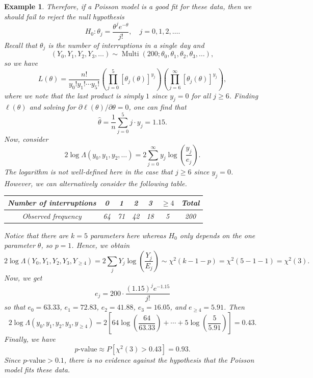 \documentclass[10pt]{article}
\DeclareMathOperator{\Multi}{Multi}
\theoremstyle{newstyle}
\newtheorem{exmp}[thm]{Example}
\begin{document}
\begin{exmp}
{Therefore, if a Poisson model is a good fit for these data, then we should fail to reject the 
null hypothesis 
\[ H_0 : \theta_j = \frac{\theta^j e^{-\theta}}{j!}, \quad j = 0, 1, 2, \dots. \]
Recall that $\theta_j$ is the number of interruptions in a single day and 
\[ (Y_0, Y_1, Y_2, Y_3, \dots) \sim \Multi(200; \theta_0, \theta_1, \theta_2, \theta_3, \dots), \]
so we have
\[ L(\theta) = \frac{n!}{y_0!y_1! \cdots y_5!} \left( \prod_{j=0}^5 [\theta_j(\theta)]^{y_j} \right) 
\left( \prod_{j=6}^\infty [\theta_j(\theta)]^{y_j} \right), \]
where we note that the last product is simply $1$ since $y_j = 0$ for all $j \geq 6$. 
Finding $\ell(\theta)$ and solving for $\partial\ell(\theta)/\partial\theta = 0$, one can find that 
\[ \hat\theta = \frac1n \sum_{j=0}^5 j \cdot y_j = 1.15. \]
Now, consider 
\[ 2\log\Lambda(y_0, y_1, y_2, \dots) = 2\sum_{j=0}^\infty y_j \log \left( \frac{y_j}{e_j} \right). \]
The logarithm is not well-defined here in the case that $j \geq 6$ since $y_j = 0$. However, 
we can alternatively consider the following table. 
\begin{table}[H]
\color{blue}
\centering
\begin{tabular}{|c|c|c|c|c|c|c|}
\hline
Number of interruptions & 0  & 1  & 2  & 3  & $\geq 4$ & Total \\ \hline
Observed frequency      & 64 & 71 & 42 & 18 & 5      & 200   \\ \hline
\end{tabular}
\end{table}
Notice that there are $k = 5$ parameters here whereas $H_0$ only depends on the one parameter $\theta$, so 
$p = 1$. Hence, we obtain 
\[ 2\log\Lambda(Y_0, Y_1, Y_2, Y_3, Y_{\geq 4}) = 2\sum_j Y_j\log \left( \frac{Y_j}{E_j} \right) 
\sim \chi^2(k-1-p) = \chi^2(5-1-1) = \chi^2(3). \]
Now, we get 
\[ e_j = 200 \cdot \frac{(1.15)^j e^{-1.15}}{j!} \]
so that $e_0 = 63.33$, $e_1 = 72.83$, $e_2 = 41.88$, $e_3 = 16.05$, and $e_{\geq 4} = 5.91$. Then 
\[ 2\log\Lambda(y_0, y_1, y_2, y_3, y_{\geq4}) = 2 \left[ 64 \log \left(\frac{64}{63.33} \right)
+ \cdots + 5 \log \left( \frac{5}{5.91} \right) \right] = 0.43. \]
Finally, we have 
\[ \text{$p$-value} \approx P[\chi^2(3) > 0.43] = 0.93. \]
Since $\text{$p$-value} > 0.1$, there is no evidence against the hypothesis that the Poisson model 
fits these data.}
\end{exmp}
\end{document}
